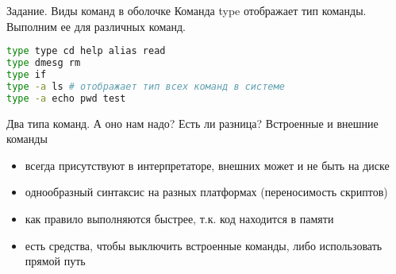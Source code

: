 \begin{frame}[fragile]{Задание. Виды команд в оболочке}
Команда  \alert{type} отображает тип команды. Выполним ее для различных команд.
\begin{lstlisting}[language=bash]
type type cd help alias read
type dmesg rm
type if
type -a ls # отображает тип всех команд в системе
type -a echo pwd test
\end{lstlisting}
Два типа команд. А оно нам надо? Есть ли разница?
\pause
Встроенные и внешние команды
\begin{itemize}
    \item всегда присутствуют в интерпретаторе, внешних может и не быть на диске
    \item однообразный синтаксис на разных платформах (переносимость скриптов)
    \item как правило выполняются быстрее, т.к. код находится в памяти
    \item есть средства, чтобы выключить встроенные команды, либо использовать прямой путь
\end{itemize}
\end{frame}
